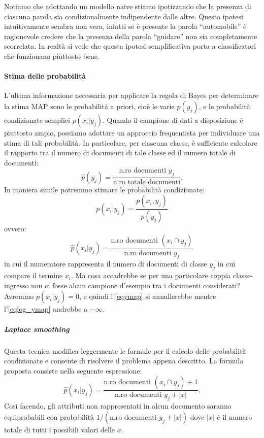 Notiamo che adottando un modello naive stiamo ipotizzando che la presenza di ciascuna parola sia condizionalmente indipendente dalle altre. Questa ipotesi intuitivamente sembra non vera, infatti se è presente la parola ``automobile'' è ragionevole credere che la presenza della parola ``guidare'' non sia completamente scorrelata. In realtà si vede che questa ipotesi semplificativa porta a classificatori che funzionano piuttosto bene.


\paragraph{Stima delle probabilità}
L'ultima informazione necessaria per applicare la regola di Bayes per determinare la stima MAP sono le probabilità a priori, cioè le varie  $p(y_j)$, e le probabilità condizionate semplici $p(x_i | y_j)$. Quando il campione di dati a disposizione è piuttosto ampio, possiamo adottare un approccio frequentista per individuare una stima di tali probabilità. In particolare,  per ciascuna classe, è sufficiente calcolare il rapporto tra il numero di documenti di tale classe ed il numero totale di documenti:
\begin{dmath*}
\hat{p}(y_j) = \frac{\text{n.ro documenti }y_j}{\text{n.ro totale documenti}}.
\end{dmath*}
In maniera simile potremmo stimare le probabilità condizionate:
\begin{equation*}
p(x_i | y_j) = \frac{p(x_i,y_j) }{p(y_j)} 
\end{equation*}
ovvero:
\begin{equation*}
\hat{p}(x_i | y_j) = \frac{\text{n.ro documenti }(x_i \cap y_j)} {\text{n.ro documenti } y_j}
\end{equation*}
in cui il numeratore rappresenta il numero di documenti di classe $y_j$ in cui compare il termine $x_i$.
Ma cosa accadrebbe se per una particolare coppia classe-ingresso non ci fosse alcun campione d'esempio tra i documenti considerati? Avremmo $p(x_i | y_j ) = 0$, e quindi l'\autoref{eqymap} si annullerebbe mentre l'\autoref{eqlog_ymap} andrebbe a $-\infty$.

\subparagraph{Laplace smoothing}
Questa tecnica modifica leggermente le formule per il calcolo delle probabilità condizionate e consente di risolvere il problema appena descritto. La formula proposta consiste nella seguente espressione:
\begin{equation*}
\hat{p}(x_i | y_j) = \frac{\text{n.ro documenti }(x_i \cap y_j) +1 } {\text{n.ro documenti } y_j + |x|}.
\end{equation*}
Così facendo, gli attributi non rappresentati in alcun documento saranno equiprobabili con probabilità $1/(\mbox{n.ro documenti } y_j+|x|)$ dove $|x|$ è il numero totale di tutti i possibili valori delle $x$.